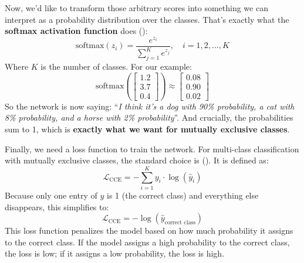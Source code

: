 \begin{itemize}
        Now, we'd like to transform those arbitrary scores into something we can interpret as a probability distribution over the classes. That's exactly what the \textbf{softmax activation function} does ():
        \begin{equation*}
            \text{softmax}(z_i) = \frac{e^{z_i}}{\sum_{j=1}^{K} e^{z_j}}, \quad i = 1, 2, \ldots, K
        \end{equation*}
        Where $K$ is the number of classes. For our example:
        \begin{equation*}
            \text{softmax}\left(
                \begin{bmatrix}
                    1.2 \\
                    3.7 \\
                    0.4
            \end{bmatrix}\right) \approx
            \begin{bmatrix}
                0.08 \\
                0.90 \\
                0.02
            \end{bmatrix}
        \end{equation*}
        So the network is now saying: ``\emph{I think it's a dog with 90\% probability, a cat with 8\% probability, and a horse with 2\% probability}''. And crucially, the probabilities sum to 1, which is \textbf{exactly what we want for mutually exclusive classes}.

        Finally, we need a loss function to train the network. For multi-class classification with mutually exclusive classes, the standard choice is  (). It is defined as:
        \begin{equation*}
            \mathcal{L}_{\text{CCE}} = - \sum_{i=1}^{K} y_i \cdot \log(\hat{y}_i)
        \end{equation*}
        Because only one entry of $y$ is 1 (the correct class) and everything else disappears, this simplifies to:
        \begin{equation*}
            \mathcal{L}_{\text{CCE}} = - \log(\hat{y}_{\text{correct class}})
        \end{equation*}
        This loss function penalizes the model based on how much probability it assigns to the correct class. If the model assigns a high probability to the correct class, the loss is low; if it assigns a low probability, the loss is high.


\end{itemize}
